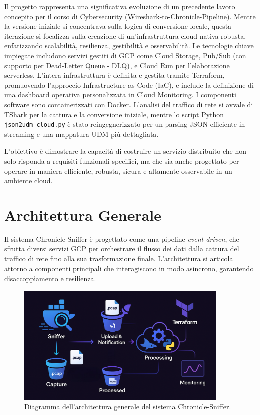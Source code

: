 \documentclass[11pt, a4paper]{article}
\begin{document}
Il progetto rappresenta una significativa evoluzione di un precedente lavoro concepito per il corso di Cybersecurity (Wireshark-to-Chronicle-Pipeline). Mentre la versione iniziale si concentrava sulla logica di conversione locale, questa iterazione si focalizza sulla creazione di un'infrastruttura cloud-nativa robusta, enfatizzando scalabilità, resilienza, gestibilità e osservabilità. Le tecnologie chiave impiegate includono servizi gestiti di GCP come Cloud Storage, Pub/Sub (con supporto per Dead-Letter Queue - DLQ), e Cloud Run per l'elaborazione serverless. L'intera infrastruttura è definita e gestita tramite Terraform, promuovendo l'approccio Infrastructure as Code (IaC), e include la definizione di una dashboard operativa personalizzata in Cloud Monitoring. I componenti software sono containerizzati con Docker. L'analisi del traffico di rete si avvale di TShark per la cattura e la conversione iniziale, mentre lo script Python \texttt{json2udm\_cloud.py} è stato reingegnerizzato per un parsing JSON efficiente in streaming e una mappatura UDM più dettagliata.

L'obiettivo è dimostrare la capacità di costruire un servizio distribuito che non solo risponda a requisiti funzionali specifici, ma che sia anche progettato per operare in maniera efficiente, robusta, sicura e altamente osservabile in un ambiente cloud.

\section{Architettura Generale}
\label{sec:architettura_generale}

Il sistema Chronicle-Sniffer è progettato come una pipeline \textit{event-driven}, che sfrutta diversi servizi GCP per orchestrare il flusso dei dati dalla cattura del traffico di rete fino alla sua trasformazione finale. L'architettura si articola attorno a componenti principali che interagiscono in modo asincrono, garantendo disaccoppiamento e resilienza.

\begin{figure}[!htbp]
    \centering
    \includegraphics[width=0.9\textwidth]{pics/WORKFLOW.png}
    \caption{Diagramma dell'architettura generale del sistema Chronicle-Sniffer.}
    \label{fig:arch_diagram}
\end{figure}
\end{document}
